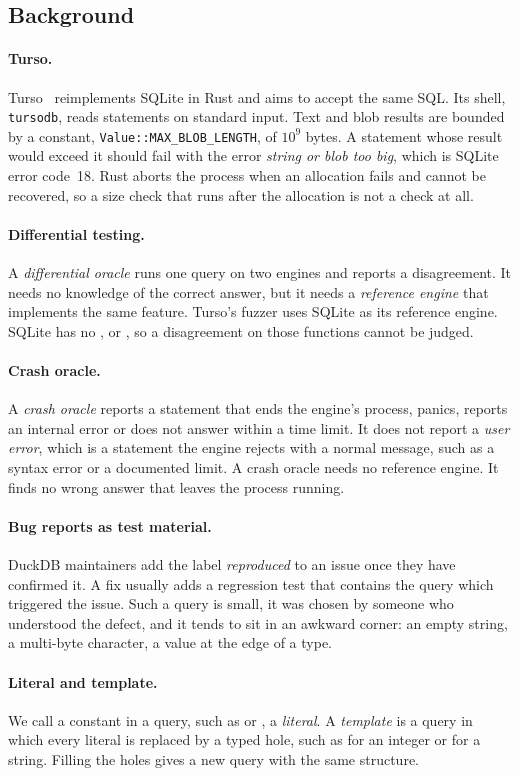 \subsection{Background}
\label{sec:background}

\paragraph{Turso.} Turso~\cite{turso} reimplements SQLite in Rust and aims to
accept the same SQL. Its shell, \texttt{tursodb}, reads statements on standard
input. Text and blob results are bounded by a constant,
\texttt{Value::MAX\_BLOB\_LENGTH}, of $10^9$ bytes. A statement whose result
would exceed it should fail with the error \emph{string or blob too big}, which
is SQLite error code~18. Rust aborts the process when an allocation fails and cannot be
recovered, so a size check that runs after the allocation is not a check at all.

\paragraph{Differential testing.} A \emph{differential oracle} runs one query on
two engines and reports a disagreement. It needs no knowledge of the correct
answer, but it needs a \emph{reference engine} that implements the same feature.
Turso's fuzzer uses SQLite as its reference engine. SQLite has no ,
 or , so a disagreement on those functions cannot be
judged.

\paragraph{Crash oracle.} A \emph{crash oracle} reports a statement that ends the
engine's process, panics, reports an internal error or does not answer within a
time limit. It does not report a \emph{user error}, which is a statement the
engine rejects with a normal message, such as a syntax error or a documented
limit. A crash oracle needs no reference engine. It finds no wrong answer that
leaves the process running.

\paragraph{Bug reports as test material.} DuckDB maintainers add the label
\emph{reproduced} to an issue once they have confirmed it. A fix usually adds a
regression test that contains the query which triggered the issue. Such a query
is small, it was chosen by someone who understood the defect, and it tends to sit
in an awkward corner: an empty string, a multi-byte character, a value at the
edge of a type.

\paragraph{Literal and template.} We call a constant in a query, such as
 or , a \emph{literal}. A \emph{template} is a query in which
every literal is replaced by a typed hole, such as  for an integer or
 for a string. Filling the holes gives a new query with the same
structure.
